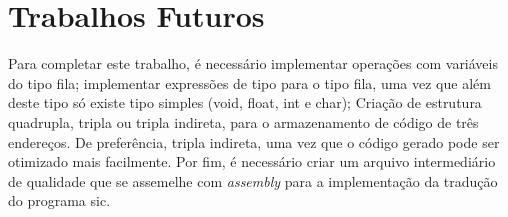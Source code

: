 \documentclass[12pt]{article}
\begin{document}
\section{Trabalhos Futuros}

\indent Para completar este trabalho, é necessário implementar operações com variáveis do tipo fila; implementar expressões de tipo para o tipo fila, uma vez que além deste tipo só existe tipo simples (void, float, int e char); Criação de estrutura quadrupla, tripla ou tripla indireta, para o armazenamento de código de três endereços. De preferência, tripla indireta, uma vez que o código gerado pode ser otimizado mais facilmente. Por fim, é necessário criar um arquivo intermediário de qualidade que se assemelhe com \textit{assembly} para a implementação da tradução do programa sic.

\end{document}

